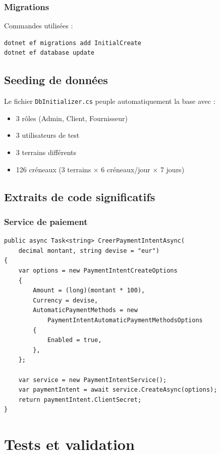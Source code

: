 \documentclass[12pt,a4paper]{article}
\begin{document}
\subsubsection{Migrations}
Commandes utilisées :
\begin{lstlisting}[language=bash]
dotnet ef migrations add InitialCreate
dotnet ef database update
\end{lstlisting}

\subsection{Seeding de données}
Le fichier \texttt{DbInitializer.cs} peuple automatiquement la base avec :
\begin{itemize}
    \item 3 rôles (Admin, Client, Fournisseur)
    \item 3 utilisateurs de test
    \item 3 terrains différents
    \item 126 créneaux (3 terrains × 6 créneaux/jour × 7 jours)
\end{itemize}

\subsection{Extraits de code significatifs}

\subsubsection{Service de paiement}
\begin{lstlisting}[language={[Sharp]C}]
public async Task<string> CreerPaymentIntentAsync(
    decimal montant, string devise = "eur")
{
    var options = new PaymentIntentCreateOptions
    {
        Amount = (long)(montant * 100),
        Currency = devise,
        AutomaticPaymentMethods = new 
            PaymentIntentAutomaticPaymentMethodsOptions
        {
            Enabled = true,
        },
    };
    
    var service = new PaymentIntentService();
    var paymentIntent = await service.CreateAsync(options);
    return paymentIntent.ClientSecret;
}
\end{lstlisting}


\section{Tests et validation}
\end{document}
